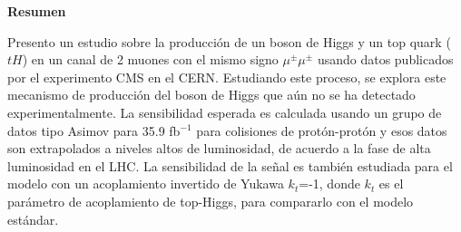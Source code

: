 \thispagestyle{empty}
 \vspace*{2.2cm}
\begin{center}
\Large \textbf{Resumen}
\end{center} 
\vspace{1.5cm}
	\begin{poliabstract}
	Presento un estudio sobre la producci\'on de un boson de Higgs y un top quark ($tH$) en un canal de 2 muones con el mismo signo $\mu^\pm \mu^\pm$ usando datos publicados por el experimento CMS en el CERN. Estudiando este proceso, se explora este mecanismo de producci\'on del boson de Higgs que a\'un no se ha detectado experimentalmente. La sensibilidad esperada es calculada usando un grupo de datos tipo Asimov para 35.9 fb$^{-1}$ para colisiones de prot\'on-prot\'on y esos datos son extrapolados a niveles altos de luminosidad, de acuerdo a la fase de alta luminosidad en el LHC. La sensibilidad de la se\~nal es tambi\'en estudiada para el modelo con un acoplamiento invertido de Yukawa $k_t$=-1, donde $k_t$ es el par\'ametro de acoplamiento de top-Higgs, para compararlo con el modelo est\'andar.
\end{poliabstract}
